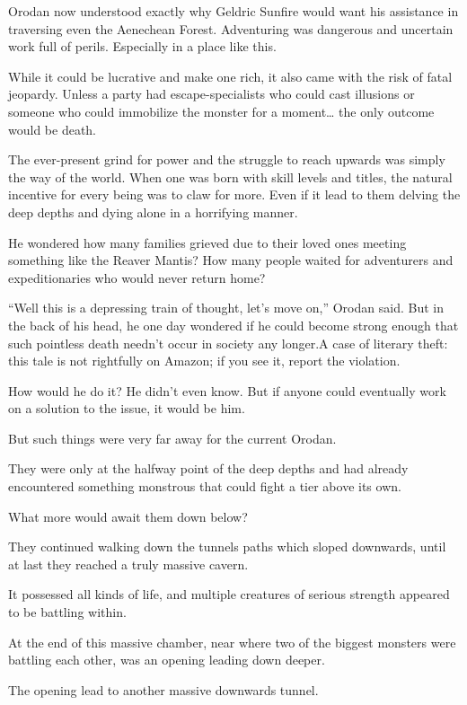 \documentclass[a4paper,10pt]{book}
\begin{document}
Orodan now understood exactly why Geldric Sunfire would want his assistance in traversing even the Aenechean Forest. Adventuring was dangerous and uncertain work full of perils. Especially in a place like this.\par
While it could be lucrative and make one rich, it also came with the risk of fatal jeopardy. Unless a party had escape-specialists who could cast illusions or someone who could immobilize the monster for a moment… the only outcome would be death.\par
The ever-present grind for power and the struggle to reach upwards was simply the way of the world. When one was born with skill levels and titles, the natural incentive for every being was to claw for more. Even if it lead to them delving the deep depths and dying alone in a horrifying manner.\par
He wondered how many families grieved due to their loved ones meeting something like the Reaver Mantis? How many people waited for adventurers and expeditionaries who would never return home?\par
“Well this is a depressing train of thought, let’s move on,” Orodan said. But in the back of his head, he one day wondered if he could become strong enough that such pointless death needn’t occur in society any longer.A case of literary theft: this tale is not rightfully on Amazon; if you see it, report the violation.\par
How would he do it? He didn’t even know. But if anyone could eventually work on a solution to the issue, it would be him.\par
But such things were very far away for the current Orodan.\par
They were only at the halfway point of the deep depths and had already encountered something monstrous that could fight a tier above its own.\par
What more would await them down below?\par
They continued walking down the tunnels paths which sloped downwards, until at last they reached a truly massive cavern.\par
It possessed all kinds of life, and multiple creatures of serious strength appeared to be battling within.\par
At the end of this massive chamber, near where two of the biggest monsters were battling each other, was an opening leading down deeper.\par
The opening lead to another massive downwards tunnel.\par
\end{document}
